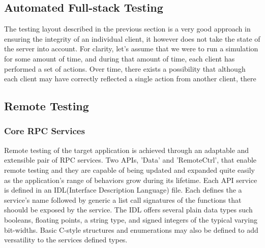 \documentclass[conference]{IEEEtran}
\begin{document}
\subsection{Automated Full-stack Testing}

The testing layout described in the previous section is a very good approach in ensuring the integrity of an individual client, it however does not take the state of the server into account.
For clarity, let's assume that we were to run a simulation for some amount of time, and during that amount of time, each client has performed a set of actions. Over time, there exists a possibility that 
although each client may have correctly reflected a single action from another client, there 


\subsection{Remote Testing}

\subsubsection{Core RPC Services}Remote testing of the target application is achieved through an adaptable and extensible pair of RPC services. Two APIs, 'Data' and 'RemoteCtrl', that enable remote testing and they are capable of being updated and expanded quite easily as the application's range of behaviors grow during its lifetime. Each API service is defined in an IDL(Interface Description Language) file. Each defines the a service's name followed by generic a list call signatures of the functions that shoould be exposed by the service. The IDL offers several plain data types such booleans, floating points, a string type, and signed integers of the typical varying bit-widths. Basic C-style structures and enumerations may also be defined to add versatility to the services defined types.
\end{document}
